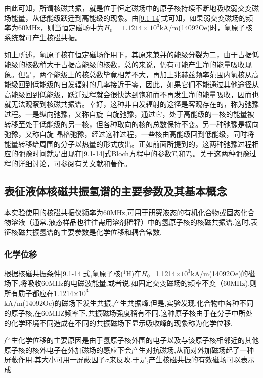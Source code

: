 \documentclass[a4paper]{article}
\begin{document}
由此可知，所谓核磁共振，就是位于恒定磁场中的原子核持续不断地吸收弱交变磁场能量，从低能级跃迁到高能级的现象。由\ref{9.1-14}式可知，如果弱交变磁场的频率为60MHz，则当恒定磁场中为$H_0=1.1214\times 10^3$kA/m(14092Oe)时，氢原子核系统就可产生核磁共振。

如上所述，氢原子核在恒定磁场作用下，其原来兼并的能级分裂为二，由于占据低能级的核数稍大于占据高能级的核数，总的来说，仍有可能产生净的能量吸收现象。但是，两个能级上的核总数毕竟相差不大，再加上兆赫兹频率范围内氢核从高能级回到低能级的自发辐射的几率接近于零，因此，如果它们不能通过其他途径从高能级回到低能级，跃迁过程就会很快达到饱和而不再发生净的能量吸收，因而也就无法观察到核磁共振谱。幸好，这种非自发辐射的途径是客观存在的，称为弛豫过程。一是纵向弛豫，又称自旋-自旋弛豫，通过它，处于高能级的一核的能量被转移至处于低能级的另一核，但各种取向的核的总数保持不变。另一种弛豫是横向弛豫，又称自旋-晶格弛豫，经过这种过程，一些核由高能级回到低能级，同时将能量转移给周围的分子以热量的形式放出。正如前面所提到的，这两种弛豫过程相应的弛豫时间就是出现在\ref{9.1-14}式Bloch方程中的参数$T_1$和$T_2$。关于这两种弛豫过程的详细讨论，可参阅有关文献和著作。

\subsection{表征液体核磁共振氢谱的主要参数及其基本概念}

本实验使用的核磁共振仪频率为60MHz,可用于研究液态的有机化合物或固态化合物溶液（通常,液态样品也往往需用溶剂稀释）中的氢原子核的核磁共振谱.这时,表征核磁共振氢谱的主要参数是化学位移和耦合常数.

\subsubsection{化学位移}

根据核磁共振条件\ref{9.1-14}式,氢原子核($^1$H)在$H_0$=1.1214$\times 10^{3}$kA/m(14092Oe)的磁场下,将吸收60MHz的电磁波能量,或者说,如固定交变磁场的频率不变（60MHz),则所有质子都应在1.1214$\times 10^{3}$\\kA/m(14092Oe)的磁场下发生共振,产生共振峰.但是,实验发现,化合物中各种不同的原子核,在60MHZ频率下,共振磁场强度稍有不同.这种原子核由于在分子中所处的化学环境不同造成在不同的共振磁场下显示吸收峰的现象称为化学位移.

产生化学位移的主要原因是由于氢原子核外围的电子以及与该原子核相邻近的其他原子核的核外电子在外加磁场的感应下会产生对抗磁场,从而对外加磁场起了一种屏蔽作用.其大小可用一屏蔽因子$\sigma$来反映.于是,产生核磁共振的有效磁场可以表示成
\end{document}
